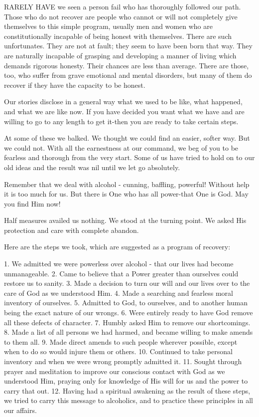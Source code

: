 
\bbChapterPreamble


\begin{biblechapter}
    RARELY HAVE we seen a person fail who has thoroughly followed our path.  Those who do not recover are people who cannot or will not completely give themselves to this simple program, usually men and women who are constitutionally incapable of being honest with themselves.  There are such unfortunates.  They are not at fault; they seem to have been born that way.  They are naturally incapable of grasping and developing a manner of living which demands rigorous honesty.  Their chances are less than average.  There are those, too, who suffer from grave emotional and mental disorders, but many of them do recover if they have the capacity to be honest.

Our stories disclose in a general way what we used to be like, what happened, and what we are like now. If you have decided you want what we have and are willing to go to any length to get it-then you are ready to take certain steps.

At some of these we balked.  We thought we could find an easier, softer way.  But we could not.  With all the earnestness at our command, we beg of you to be fearless and thorough from the very start.  Some of us have tried to hold on to our old ideas and the result was nil until we let go absolutely.

Remember that we deal with alcohol - cunning, baffling, powerful!  Without help it is too much for us.  But there is One who has all power-that One is God.  May you find Him now!

Half measures availed us nothing.  We stood at the turning point.  We asked His protection and care with complete abandon.

Here are the steps we took, which are suggested as a program of recovery:

1. We admitted we were powerless over alcohol - that our lives had become unmanageable.
2. Came to believe that a Power greater than ourselves could restore us to sanity.
3. Made a decision to turn our will and our lives over to the care of God as we understood Him.
4. Made a searching and fearless moral inventory of ourselves.
5. Admitted to God, to ourselves, and to another human being the exact nature of our wrongs.
6. Were entirely ready to have God remove all these defects of character.
7. Humbly asked Him to remove our shortcomings.
8. Made a list of all persons we had harmed, and became willing to make amends to them all.
9. Made direct amends to such people wherever possible, except when to do so would injure them or others.
10. Continued to take personal inventory and when we were wrong promptly admitted it.
11. Sought through prayer and meditation to improve our conscious contact with God as we understood Him, praying only for knowledge of His will for us and the power to carry that out.
12. Having had a spiritual awakening as the result of these steps, we tried to carry this message to alcoholics, and to practice these principles in all our affairs.


\end{biblechapter}
